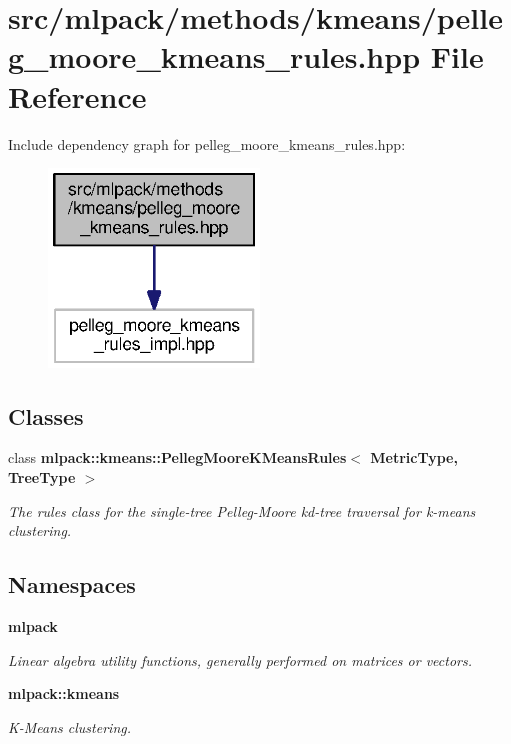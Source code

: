 \section{src/mlpack/methods/kmeans/pelleg\+\_\+moore\+\_\+kmeans\+\_\+rules.hpp File Reference}
\label{pelleg__moore__kmeans__rules_8hpp}
Include dependency graph for pelleg\+\_\+moore\+\_\+kmeans\+\_\+rules.\+hpp\+:
\nopagebreak
\begin{figure}[H]
\begin{center}
\leavevmode
\includegraphics[width=159pt]{pelleg__moore__kmeans__rules_8hpp__incl}
\end{center}
\end{figure}
\subsection*{Classes}
\begin{DoxyCompactItemize}
\item 
class {\bf mlpack\+::kmeans\+::\+Pelleg\+Moore\+K\+Means\+Rules$<$ Metric\+Type, Tree\+Type $>$}
\begin{DoxyCompactList}\small\item\em The rules class for the single-\/tree Pelleg-\/\+Moore kd-\/tree traversal for k-\/means clustering. \end{DoxyCompactList}\end{DoxyCompactItemize}
\subsection*{Namespaces}
\begin{DoxyCompactItemize}
\item 
 {\bf mlpack}
\begin{DoxyCompactList}\small\item\em Linear algebra utility functions, generally performed on matrices or vectors. \end{DoxyCompactList}\item 
 {\bf mlpack\+::kmeans}
\begin{DoxyCompactList}\small\item\em K-\/\+Means clustering. \end{DoxyCompactList}\end{DoxyCompactItemize}
